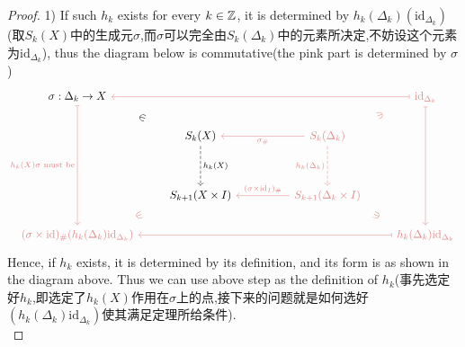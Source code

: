 \documentclass{article}
\begin{document}
\begin{proof}
    1) If such $h_k$ exists for every $k \in \mathbb{Z}$, it is determined by $h_k(\Delta_k)(\text{id}_{\Delta_k})$(取$S_k(X)$中的生成元$\sigma$,而$\sigma$可以完全由$S_k(\Delta_k)$中的元素所决定,不妨设这个元素为$\text{id}_{\Delta_k}$), thus the diagram below is commutative(the pink part is determined by $\sigma$)
    \[\begin{tikzcd}
        {\sigma:\Delta_k \to X} &&&& \textcolor{rgb,255:red,224;green,133;blue,133}{\text{id}_{\Delta_k}} \\
        & {S_k(X)} && \textcolor{rgb,255:red,224;green,133;blue,133}{S_k(\Delta_k)} \\
        \\
        & {S_{k+1}(X \times I)} && \textcolor{rgb,255:red,224;green,133;blue,133}{S_{k+1}(\Delta_k \times I)} \\
        \textcolor{rgb,255:red,224;green,133;blue,133}{(\sigma \times \text{id})_\#(h_k(\Delta_k)\text{id}_{\Delta_k})} &&&& \textcolor{rgb,255:red,224;green,133;blue,133}{h_k(\Delta_k)\text{id}_{\Delta_k}}
        \arrow["{h_k(\Delta_k)}"', color={rgb,255:red,224;green,133;blue,133}, dashed, from=2-4, to=4-4]
        \arrow["{h_k(X)}", dashed, from=2-2, to=4-2]
        \arrow["{h_k(X)\sigma \,\, \text{must be}}"', color={rgb,255:red,224;green,133;blue,133}, maps to, from=1-1, to=5-1]
        \arrow[color={rgb,255:red,224;green,133;blue,133}, maps to, from=1-5, to=1-1]
        \arrow["\in"{marking}, draw=none, from=1-1, to=2-2]
        \arrow["\in"{marking}, color={rgb,255:red,224;green,133;blue,133}, draw=none, from=5-1, to=4-2]
        \arrow["\ni"{marking}, color={rgb,255:red,224;green,133;blue,133}, draw=none, from=1-5, to=2-4]
        \arrow["\ni"{marking}, color={rgb,255:red,224;green,133;blue,133}, draw=none, from=5-5, to=4-4]
        \arrow[color={rgb,255:red,224;green,133;blue,133}, maps to, from=1-5, to=5-5]
        \arrow[color={rgb,255:red,224;green,133;blue,133}, maps to, from=5-5, to=5-1]
        \arrow["{(\sigma \times\text{id}_I)_\#}"', color={rgb,255:red,224;green,133;blue,133}, from=4-4, to=4-2]
        \arrow["{\sigma_\#}", color={rgb,255:red,224;green,133;blue,133}, from=2-4, to=2-2]
    \end{tikzcd}\]
    Hence, if $h_k$ exists, it is determined by its definition, and its form is as shown in the diagram above. Thus we can use above step as the definition of $h_k$(事先选定好$h_k$,即选定了$h_k(X)$作用在$\sigma$上的点,接下来的问题就是如何选好$(h_k(\Delta_k)\text{id}_{\Delta_k})$使其满足定理所给条件).\\

\end{proof}
\end{document}
